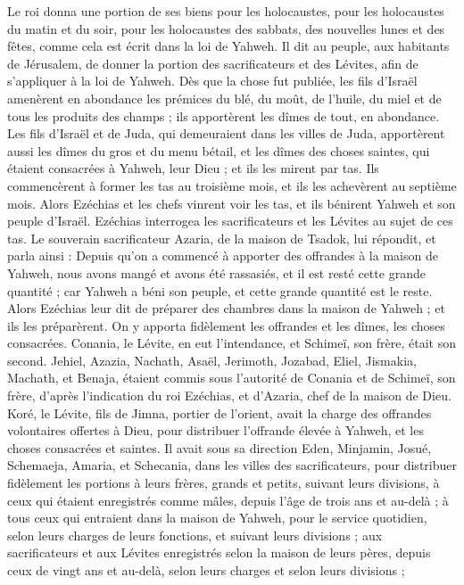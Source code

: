 \begin{multicols}{2}
Le roi donna une portion de ses biens pour les holocaustes, pour les holocaustes du matin et du soir, pour les holocaustes des sabbats, des nouvelles lunes et des fêtes, comme cela est écrit dans la loi de Yahweh.
Il dit au peuple, aux habitants de Jérusalem, de donner la portion des sacrificateurs et des Lévites, afin de s'appliquer à la loi de Yahweh.
Dès que la chose fut publiée, les fils d'Israël amenèrent en abondance les prémices du blé, du moût, de l'huile, du miel et de tous les produits des champs ; ils apportèrent les dîmes de tout, en abondance.
Les fils d'Israël et de Juda, qui demeuraient dans les villes de Juda, apportèrent aussi les dîmes du gros et du menu bétail, et les dîmes des choses saintes, qui étaient consacrées à Yahweh, leur Dieu ; et ils les mirent par tas.
Ils commencèrent à former les tas au troisième mois, et ils les achevèrent au septième mois.
Alors Ezéchias et les chefs vinrent voir les tas, et ils bénirent Yahweh et son peuple d'Israël.
Ezéchias interrogea les sacrificateurs et les Lévites au sujet de ces tas.
Le souverain sacrificateur Azaria, de la maison de Tsadok, lui répondit, et parla ainsi : Depuis qu'on a commencé à apporter des offrandes à la maison de Yahweh, nous avons mangé et avons été rassasiés, et il est resté cette grande quantité ; car Yahweh a béni son peuple, et cette grande quantité est le reste.
Alors Ezéchias leur dit de préparer des chambres dans la maison de Yahweh ; et ils les préparèrent.
On y apporta fidèlement les offrandes et les dîmes, les choses consacrées. Conania, le Lévite, en eut l'intendance, et Schimeï, son frère, était son second.
Jehiel, Azazia, Nachath, Asaël, Jerimoth, Jozabad, Eliel, Jismakia, Machath, et Benaja, étaient commis sous l'autorité de Conania et de Schimeï, son frère, d'après l'indication du roi Ezéchias, et d'Azaria, chef de la maison de Dieu.
Koré, le Lévite, fils de Jimna, portier de l'orient, avait la charge des offrandes volontaires offertes à Dieu, pour distribuer l'offrande élevée à Yahweh, et les choses consacrées et saintes.
Il avait sous sa direction Eden, Minjamin, Josué, Schemaeja, Amaria, et Schecania, dans les villes des sacrificateurs, pour distribuer fidèlement les portions à leurs frères, grands et petits, suivant leurs divisions,
à ceux qui étaient enregistrés comme mâles, depuis l'âge de trois ans et au-delà ; à tous ceux qui entraient dans la maison de Yahweh, pour le service quotidien, selon leurs charges de leurs fonctions, et suivant leurs divisions ;
aux sacrificateurs et aux Lévites enregistrés selon la maison de leurs pères, depuis ceux de vingt ans et au-delà, selon leurs charges et selon leurs divisions ;

\end{multicols}
